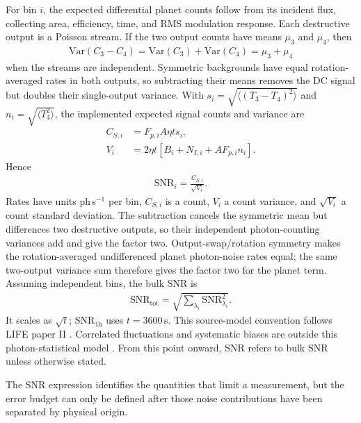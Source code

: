 \documentclass[12pt,a4paper]{article}
\numberwithin{equation}{section}
\numberwithin{figure}{section}
\numberwithin{table}{section}
\begin{document}
For bin $i$, the expected differential planet counts follow from its incident flux, collecting area, efficiency, time, and RMS modulation response. Each destructive output is a Poisson stream. If the two output counts have means $\mu_3$ and $\mu_4$, then
\begin{align}
\mathrm{Var}(C_3-C_4)=\mathrm{Var}(C_3)+\mathrm{Var}(C_4)=\mu_3+\mu_4
\end{align}
when the streams are independent. Symmetric backgrounds have equal rotation-averaged rates in both outputs, so subtracting their means removes the DC signal but doubles their single-output variance. With $s_i=\sqrt{\langle(T_3-T_4)^2\rangle}$ and $n_i=\sqrt{\langle T_4^2\rangle}$, the implemented expected signal counts and variance are
\begin{align}
C_{S,i}&=F_{p,i}A\eta t s_i,\\
V_i&=2\eta t\left[B_i+N_{I,i}+AF_{p,i}n_i\right].
\end{align}
Hence
\begin{align} \label{eq: bin snr}
\mathrm{SNR}_i=\frac{C_{S,i}}{\sqrt{V_i}}.
\end{align}
Rates have units ph\,s$^{-1}$ per bin, $C_{S,i}$ is a count, $V_i$ a count variance, and $\sqrt{V_i}$ a count standard deviation. The subtraction cancels the symmetric mean but differences two destructive outputs, so their independent photon-counting variances add and give the factor two. Output-swap/rotation symmetry makes the rotation-averaged undifferenced planet photon-noise rates equal; the same two-output variance sum therefore gives the factor two for the planet term. Assuming independent bins, the bulk SNR is
\begin{align} \label{eq: bulk snr}
    \text{SNR}_\text{tot} = \sqrt{\sum_{\lambda_i}\text{SNR}_{\lambda_i}^2}.
\end{align}
It scales as $\sqrt{t}$; $\mathrm{SNR}_{1\mathrm{h}}$ uses $t=3600$\,s. This source-model convention follows LIFE paper II \cite{dannert2022life2}. Correlated fluctuations and systematic biases are outside this photon-statistical model \cite{lay2004systematic,dannert2025thesis}. From this point onward, SNR refers to bulk SNR unless otherwise stated.

The SNR expression identifies the quantities that limit a measurement, but the error budget can only be defined after those noise contributions have been separated by physical origin.
\end{document}
